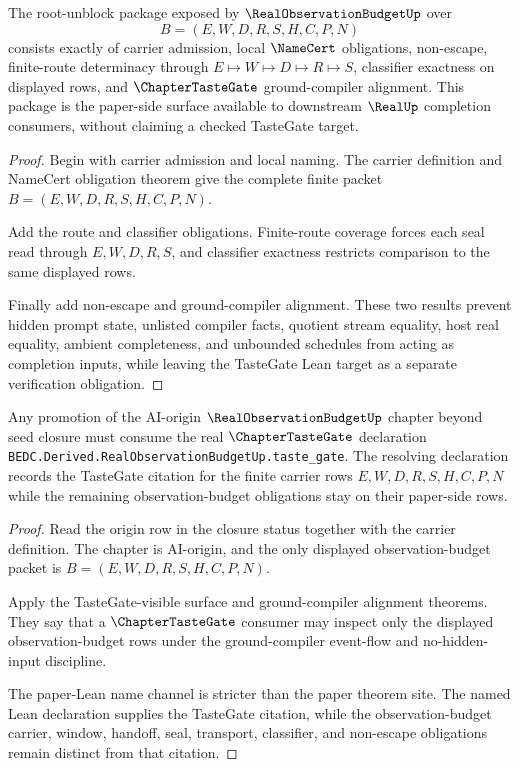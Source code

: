 \begin{theorem}
\label{thm:real-observation-budget-root-unblock-package}
The root-unblock package exposed by $\RealObservationBudgetUp$ over
$$
B=(E,W,D,R,S,H,C,P,N)
$$
consists exactly of carrier admission, local $\NameCert$ obligations, non-escape, finite-route determinacy through $E \longmapsto W \longmapsto D \longmapsto R \longmapsto S$, classifier exactness on displayed rows, and $\ChapterTasteGate$ ground-compiler alignment. This package is the paper-side surface available to downstream $\RealUp$ completion consumers, without claiming a checked TasteGate target.
\end{theorem}
\begin{proof}
Begin with carrier admission and local naming. The carrier definition and NameCert obligation theorem give the complete finite packet $B=(E,W,D,R,S,H,C,P,N)$.

Add the route and classifier obligations. Finite-route coverage forces each seal read through $E,W,D,R,S$, and classifier exactness restricts comparison to the same displayed rows.

Finally add non-escape and ground-compiler alignment. These two results prevent hidden prompt state, unlisted compiler facts, quotient stream equality, host real equality, ambient completeness, and unbounded schedules from acting as completion inputs, while leaving the TasteGate Lean target as a separate verification obligation.
\end{proof}

\begin{theorem}
\label{thm:real-observation-budget-tastegate-cited-obligation}
Any promotion of the AI-origin $\RealObservationBudgetUp$ chapter beyond seed closure must consume the real $\ChapterTasteGate$ declaration \texttt{BEDC.Derived.RealObservationBudgetUp.taste\_gate}. The resolving declaration records the TasteGate citation for the finite carrier rows $E,W,D,R,S,H,C,P,N$ while the remaining observation-budget obligations stay on their paper-side rows.
\end{theorem}
\begin{proof}
Read the origin row in the closure status together with the carrier definition. The chapter is AI-origin, and the only displayed observation-budget packet is $B=(E,W,D,R,S,H,C,P,N)$.

Apply the TasteGate-visible surface and ground-compiler alignment theorems. They say that a $\ChapterTasteGate$ consumer may inspect only the displayed observation-budget rows under the ground-compiler event-flow and no-hidden-input discipline.

The paper-Lean name channel is stricter than the paper theorem site. The named Lean declaration supplies the TasteGate citation, while the observation-budget carrier, window, handoff, seal, transport, classifier, and non-escape obligations remain distinct from that citation.
\end{proof}

